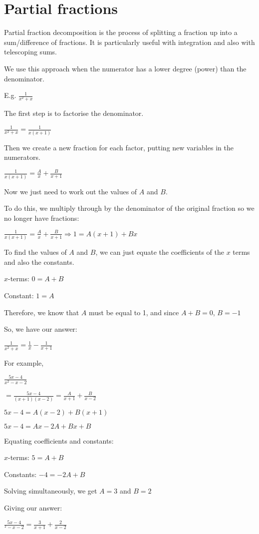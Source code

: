 \documentclass[../main.tex]{subfiles}
\begin{document}
\section{Partial fractions}
Partial fraction decomposition is the process of splitting a fraction up into a sum/difference of fractions. It is particularly useful with integration and also with telescoping sums.

We use this approach when the numerator has a lower degree (power) than the denominator.

E.g. $\frac{1}{x^2+x}$

The first step is to factorise the denominator.

$\frac{1}{x^2+x}=\frac{1}{x(x+1)}$

Then we create a new fraction for each factor, putting new variables in the numerators.

$\frac{1}{x(x+1)}=\frac{A}{x}+\frac{B}{x+1}$

Now we just need to work out the values of $A$ and $B$.

To do this, we multiply through by the denominator of the original fraction so we no longer have fractions:

$\frac{1}{x(x+1)}=\frac{A}{x}+\frac{B}{x+1} \Rightarrow 1=A(x+1)+Bx$

To find the values of $A$ and $B$, we can just equate the coefficients of the $x$ terms and also the constants.

$x$-terms: $0=A+B$

Constant: $1=A$

Therefore, we know that $A$ must be equal to 1, and since $A + B = 0$, $B=-1$

So, we have our answer:

$\frac{1}{x^2+x}=\frac{1}{x}-\frac{1}{x+1}$

For example,

$\frac{5x-4}{x^2-x-2}$

$=\frac{5x-4}{(x+1)(x-2)}=\frac{A}{x+1}+\frac{B}{x-2}$

$5x-4=A(x-2)+B(x+1)$

$5x-4=Ax-2A+Bx+B$

Equating coefficients and constants:

$x$-terms: $5=A+B$

Constants: $-4=-2A+B$

Solving simultaneously, we get $A=3$ and $B=2$

Giving our answer:

$\frac{5x-4}{^2-x-2}=\frac{3}{x+1}+\frac{2}{x-2}$
\end{document}
